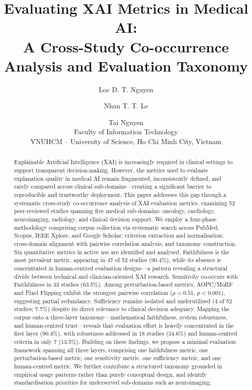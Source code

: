 \documentclass{article}
\author{
Loc D. T. Nguyen \and
Nhan T. T. Le \and
Tai Nguyen \\
Faculty of Information Technology \\
VNUHCM -- University of Science, Ho Chi Minh City, Vietnam
}
\title{Evaluating XAI Metrics in Medical AI:\\
A Cross-Study Co-occurrence Analysis and Evaluation Taxonomy}
\date{}
\begin{document}
\maketitle

\begin{abstract}
Explainable Artificial Intelligence (XAI) is increasingly required in clinical settings to support transparent decision-making. However, the metrics used to evaluate explanation quality in medical AI remain fragmented, inconsistently defined, and rarely compared across clinical sub-domains---creating a significant barrier to reproducible and trustworthy deployment. This paper addresses this gap through a systematic cross-study co-occurrence analysis of XAI evaluation metrics, examining 52 peer-reviewed studies spanning five medical sub-domains: oncology, cardiology, neuroimaging, radiology, and clinical decision support. We employ a four-phase methodology comprising corpus collection via systematic search across PubMed, Scopus, IEEE Xplore, and Google Scholar; criterion extraction and normalisation; cross-domain alignment with pairwise correlation analysis; and taxonomy construction. Six quantitative metrics in active use are identified and analysed. Faithfulness is the most prevalent metric, appearing in 47 of 52 studies (90.4\%), while its absence is concentrated in human-centred evaluation designs---a pattern revealing a structural divide between technical and clinician-oriented XAI research. Sensitivity co-occurs with Faithfulness in 33 studies (63.5\%). Among perturbation-based metrics, AOPC/MoRF and Pixel Flipping exhibit the strongest pairwise correlation ($\rho = 0.51$, $p < 0.001$), suggesting partial redundancy. Sufficiency remains isolated and underutilised (4 of 52 studies; 7.7\%) despite its direct relevance to clinical decision adequacy. Mapping the corpus onto a three-layer taxonomy---mathematical faithfulness, system robustness, and human-centred trust---reveals that evaluation effort is heavily concentrated in the first layer (90.4\%), with robustness addressed in 18 studies (34.6\%) and human-centred criteria in only 7 (13.5\%). Building on these findings, we propose a minimal evaluation framework spanning all three layers, comprising one faithfulness metric, one perturbation-based metric, one sensitivity metric, one sufficiency metric, and one human-centred metric. We further contribute a structured taxonomy grounded in empirical usage patterns rather than purely conceptual design, and identify standardisation priorities for underserved sub-domains such as neuroimaging.
\end{abstract}









\end{document}
